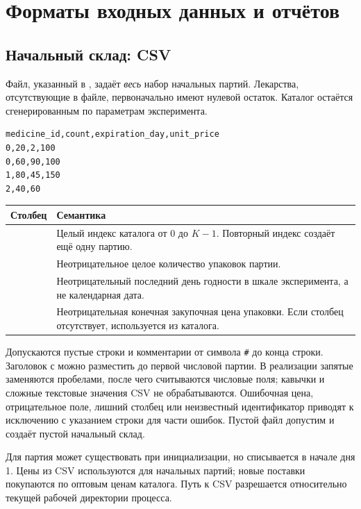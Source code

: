 \section{Форматы входных данных и отчётов}
\label{sec:formats}

\subsection{Начальный склад: CSV}
Файл, указанный в , задаёт \emph{весь} набор начальных
партий. Лекарства, отсутствующие в файле, первоначально имеют нулевой остаток.
Каталог остаётся сгенерированным по параметрам эксперимента.

\begin{lstlisting}
medicine_id,count,expiration_day,unit_price
0,20,2,100
0,60,90,100
1,80,45,150
2,40,60
\end{lstlisting}

\begin{tabularx}{\textwidth}{@{}L{0.28\textwidth}Y@{}}
\toprule
Столбец & Семантика \\
\midrule
{} & Целый индекс каталога от 0 до $K-1$.
Повторный индекс создаёт ещё одну партию. \\
 & Неотрицательное целое количество упаковок партии. \\
 & Неотрицательный последний день годности
в шкале эксперимента, а не календарная дата. \\
 & Неотрицательная конечная закупочная цена упаковки.
Если столбец отсутствует, используется  из каталога. \\
\bottomrule
\end{tabularx}

Допускаются пустые строки и комментарии от символа \texttt{\#} до конца строки.
Заголовок с  можно разместить до первой числовой партии.
В реализации запятые заменяются пробелами, после чего считываются числовые
поля; кавычки и сложные текстовые значения CSV не обрабатываются.
Ошибочная цена, отрицательное поле, лишний столбец или неизвестный
идентификатор приводят к исключению с указанием строки для части ошибок.
Пустой файл допустим и создаёт пустой начальный склад.

Для  партия может существовать при инициализации,
но списывается в начале дня 1. Цены из CSV используются для начальных партий;
новые поставки покупаются по оптовым ценам каталога.
Путь к CSV разрешается относительно текущей рабочей директории процесса.

